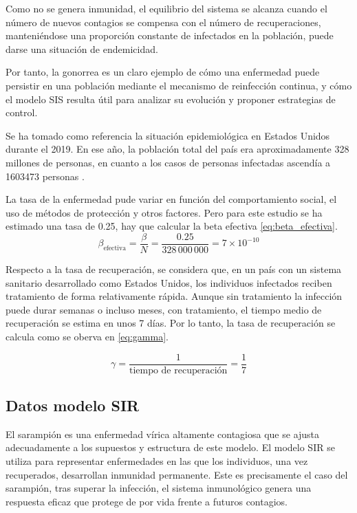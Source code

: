 Como no se genera inmunidad, el equilibrio del sistema se alcanza cuando el número de nuevos contagios se compensa con el número de recuperaciones, manteniéndose una proporción constante de infectados en la población, puede darse una situación de endemicidad.

Por tanto, la gonorrea es un claro ejemplo de cómo una enfermedad puede persistir en una población mediante el mecanismo de reinfección continua, y cómo el modelo SIS resulta útil para analizar su evolución y proponer estrategias de control.

Se ha tomado como referencia la situación epidemiológica en Estados Unidos durante el 2019. En ese año, la población total del país era aproximadamente 328 millones de personas, en cuanto a los casos de personas infectadas ascendía a 1603473 personas \cite{pollock2023estimated}.

La tasa de la enfermedad pude variar en función del comportamiento social, el uso de métodos de protección y otros factores. Pero para este estudio se ha estimado una tasa de 0.25, hay que calcular la beta efectiva \eqref{eq:beta_efectiva}.
\begin{equation}
\beta_{\text{efectiva}} = \frac{\beta}{N} = \frac{0.25}{328\,000\,000} = 7 \times 10^{-10}
\label{eq:beta_efectiva}
\end{equation}



Respecto a la tasa de recuperación, se considera que, en un país con un sistema sanitario desarrollado como Estados Unidos, los individuos infectados reciben tratamiento de forma relativamente rápida. Aunque sin tratamiento la infección puede durar semanas o incluso meses, con tratamiento, el tiempo medio de recuperación se estima en unos 7 días. Por lo tanto, la tasa de recuperación se calcula como se oberva en \eqref{eq:gamma}.

\begin{equation}
\gamma = \frac{1}{\text{tiempo de recuperación}} = \frac{1}{7}
\label{eq:gamma}
\end{equation}

\subsection{Datos modelo SIR}
El sarampión es una enfermedad vírica altamente contagiosa que se ajusta adecuadamente a los supuestos y estructura de este modelo. El modelo SIR se utiliza para representar enfermedades en las que los individuos, una vez recuperados, desarrollan inmunidad permanente. Este es precisamente el caso del sarampión, tras superar la infección, el sistema inmunológico genera una respuesta eficaz que protege de por vida frente a futuros contagios.

